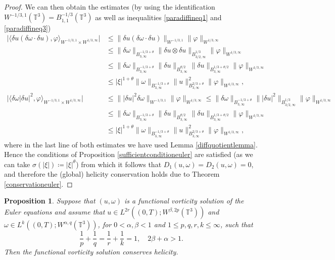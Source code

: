 \documentclass[12pt,a4paper]{article}
\newtheorem{proposition}[theorem]{Proposition}
\theoremstyle{definition}
\theoremstyle{remark}
\numberwithin{equation}{section}
\begin{document}
\begin{proof}
We can then obtain the estimates (by using the identification $W^{-1/3,1} (\mathbb{T}^3) = B^{-1/3}_{1,1} (\mathbb{T}^3)$ as well as inequalities \eqref{paradiffineq1} and \eqref{paradiffineq3}) 
\begin{align*}
\bigg\lvert \langle \delta u (\delta \omega \cdot \delta u), \varphi \rangle_{W^{-1/3,1} \times W^{1/3,\infty}} \bigg\rvert &\leq \lVert \delta u (\delta \omega \cdot \delta u) \rVert_{W^{-1/3,1}} \lVert \varphi \rVert_{W^{1/3,\infty}} \\
&\leq \lVert \delta \omega \rVert_{B^{-1/3+\theta}_{3,\infty}} \lVert \delta u \otimes \delta u \rVert_{B^{1/3}_{3/2,\infty}} \lVert \varphi \rVert_{W^{1/3,\infty}} \\
&\leq \lVert \delta \omega \rVert_{B^{-1/3+\theta}_{3,\infty}} \lVert \delta u \rVert_{B^{\theta/2}_{3,\infty}} \lVert \delta u \rVert_{B^{1/3 + \theta/2}_{3,\infty}} \lVert \varphi \rVert_{W^{1/3,\infty}} \\
&\leq \lvert \xi \rvert^{1 + \theta} \lVert \omega \rVert_{B^{-1/3+\theta}_{3,\infty}} \lVert u \rVert_{B^{2/3+\theta}_{3,\infty}}^2 \lVert \varphi \rVert_{W^{1/3,\infty}}, \\
\bigg\lvert \langle \delta \omega \lvert \delta u \rvert^2 , \varphi \rangle_{W^{-1/3,1} \times W^{1/3,\infty}} \bigg\rvert &\leq \lVert \lvert \delta u \rvert^2 \delta \omega \rVert_{W^{-1/3,1}} \lVert \varphi \rVert_{W^{1/3,\infty}} \leq \lVert \delta \omega \rVert_{B^{-1/3+\theta}_{3,\infty}} \lVert \lvert \delta u \rvert^2 \rVert_{B^{1/3}_{3/2,\infty}} \lVert \varphi \rVert_{W^{1/3,\infty}} \\
&\leq \lVert \delta \omega \rVert_{B^{-1/3+\theta}_{3,\infty}} \lVert \delta u \rVert_{B^{\theta/2}_{3,\infty}} \lVert \delta u \rVert_{B^{1/3 + \theta/2}_{3,\infty}} \lVert \varphi \rVert_{W^{1/3,\infty}} \\
&\leq \lvert \xi \rvert^{1 + \theta} \lVert \omega \rVert_{B^{-1/3+\theta}_{3,\infty}} \lVert u \rVert_{B^{2/3+\theta}_{3,\infty}}^2 \lVert \varphi \rVert_{W^{1/3,\infty}},
\end{align*}
where in the last line of both estimates we have used Lemma \ref{diffquotientlemma}.
Hence the conditions of Proposition \ref{sufficientconditioneuler} are satisfied (as we can take $\sigma (\lvert \xi \rvert) \coloneqq \lvert \xi \rvert^\theta$) from which it follows that $D_1 (u,\omega) = D_2 (u,\omega) = 0$, and therefore the (global) helicity conservation holds due to Theorem \ref{conservationeuler}.
\end{proof}
\begin{proposition}
Suppose that $(u,\omega)$ is a functional vorticity solution of the Euler equations and assume that $u \in L^{2r} ((0,T); W^{\beta, 2p} (\mathbb{T}^3))$ and $\omega \in L^k ((0,T); W^{\alpha,q} (\mathbb{T}^3))$, for $0 < \alpha, \beta < 1$ and $1 \leq p, q, r, k \leq \infty$, such that
\begin{equation*}
\frac{1}{p} + \frac{1}{q} = \frac{1}{r} + \frac{1}{k} = 1, \quad 2 \beta + \alpha > 1.
\end{equation*}
Then the functional vorticity solution conserves helicity.
\end{proposition}
\end{document}
